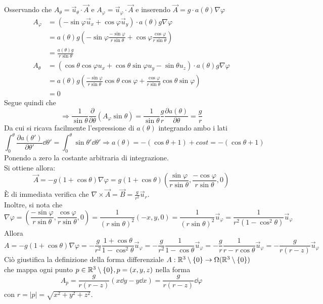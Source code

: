 Osservando che $A_\theta = \vec u _\theta \cdot \vec A $ e
$A_\varphi = \vec u _\varphi \cdot \vec A$ e inserendo $ \vec A = g \cdot a(\theta) \nabla \varphi $
\begin{equation*}
   \begin{aligned}
         A_\varphi & = (-\sin\varphi \vec u _x + \cos\varphi \vec u _y)
                       \cdot a(\theta) g \nabla \varphi \\
                   & = a(\theta)g\left( -\sin\varphi \frac{-\sin\varphi}{r\sin\theta}
                      + \cos\varphi \frac{\cos\varphi}{r\sin\theta}\right)\\
                   & = \frac{a(\theta)g}{r\sin\theta} \\
        A_\theta & = (\cos\theta \cos\varphi u_x + \cos\theta \sin\varphi u_y
                          - \sin\theta u_z) \cdot a(\theta) g \nabla \varphi \\
                 & = a(\theta) g \left( \frac{-\sin\varphi}{r\sin\theta} \cos\theta \cos\varphi
                          + \frac{\cos\varphi}{r\sin\theta} \cos\theta \sin\varphi \right) \\
                 & = 0
   \end{aligned}
\end{equation*}
Segue quindi che
$$
   \Rightarrow
   \frac{1}{\sin\theta} \frac{\partial}{\partial\theta}(A_\varphi \sin\theta)
      = \frac{1}{\sin\theta} \frac{g}{r} \frac{\partial a(\theta)}{\partial \theta}
      = \frac{g}{r}
$$
Da cui si ricava facilmente l'espressione di $a(\theta)$ integrando ambo i lati
$$
   \int_0 ^\theta \frac{\partial a(\theta')}{\partial \theta'} \dd \theta'
      = \int_0^\theta \sin\theta' \dd \theta' 
   \Rightarrow a(\theta) = -(\cos\theta+1) + cost  = -(\cos\theta+1)
$$
Ponendo a zero la costante arbitraria di integrazione.\\
%
Si ottiene allora:
$$
   \boxed{
          \vec A = -g(1 + \cos\theta) \nabla \varphi
                 = g(1 + \cos\theta)\left( \frac{\sin\varphi}{r\sin\theta},
                    \frac{-\cos\varphi}{r\sin\theta},0 \right)
   }
$$
È di immediata verifica che $\nabla \times \vec A = \vec B = \frac{g}{r^2} \vec u _r$.\\
%
Inoltre, si nota che
$$
   \nabla \varphi = \left( \frac{-\sin\varphi}{r\sin\theta},\frac{\cos\varphi}{r\sin\theta},0 \right)
      = \frac{1}{(r\sin\theta)^2}(-x,y,0) = \frac{1}{(r\sin\theta)^2}\vec u _\varphi
      = \frac{1}{r^2(1-\cos^2\theta)} \vec u _\varphi
$$
Allora
$$
   A = -g(1+\cos\theta)\nabla\varphi = -\frac{g}{r^2} \frac{1+\cos\theta}{1-\cos^2\theta} \vec u _\varphi
     = -\frac{g}{r^2} \frac{1}{1-\cos\theta} \vec u _\varphi
     = -\frac{g}{r} \frac{1}{r-r\cos\theta} \vec u _\varphi
     = -\frac{g}{r(r-z)} \vec u _\varphi
$$
Ciò giustifica la definizione della forma differenziale $ A : \mathbb{R}^3 \setminus \{0\}
\to \Omega(\mathbb{R}^3 \setminus \{0\})$ che mappa ogni punto $p \in \mathbb{R}^3 \setminus \{0\} , p = (x,y,z)$ nella forma
$$
    A_p = \frac{g}{r(r-z)}(x \dd  y - y \dd  x) = \frac{g}{r(r-z)} \dd  \varphi
$$
con $r = |p| = \sqrt{x^2+y^2+z^2}$.

